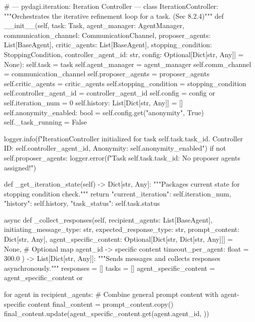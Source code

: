 \documentclass{amsbook}
\theoremstyle{definition}
\theoremstyle{remark}
\numberwithin{equation}{chapter} %
\begin{document}
\begin{python}
# --- pydagi.iteration: Iteration Controller ---
class IterationController:
    """Orchestrates the iterative refinement loop for a task. (Sec 8.2.4)"""
    def __init__(self,
                 task: Task,
                 agent_manager: AgentManager,
                 communication_channel: CommunicationChannel,
                 proposer_agents: List[BaseAgent],
                 critic_agents: List[BaseAgent],
                 stopping_condition: StoppingCondition,
                 controller_agent_id: str,
                 config: Optional[Dict[str, Any]] = None):
        self.task = task
        self.agent_manager = agent_manager
        self.comm_channel = communication_channel
        self.proposer_agents = proposer_agents
        self.critic_agents = critic_agents
        self.stopping_condition = stopping_condition
        self.controller_agent_id = controller_agent_id
        self.config = config or {}
        self.iteration_num = 0
        self.history: List[Dict[str, Any]] = []
        self.anonymity_enabled: bool = self.config.get("anonymity", True)
        self._task_running = False

        logger.info(f"IterationController initialized for task {self.task.task_id}. Controller ID: {self.controller_agent_id}, Anonymity: {self.anonymity_enabled}")
        if not self.proposer_agents: logger.error(f"Task {self.task.task_id}: No proposer agents assigned!")

    def _get_iteration_state(self) -> Dict[str, Any]:
        """Packages current state for stopping condition check."""
        return {"current_iteration": self.iteration_num, "history": self.history, "task_status": self.task.status}

    async def _collect_responses(self,
                                recipient_agents: List[BaseAgent],
                                initiating_message_type: str,
                                expected_response_type: str,
                                prompt_content: Dict[str, Any],
                                agent_specific_content: Optional[Dict[str, Dict[str, Any]]] = None, # Optional map agent_id -> specific content
                                timeout_per_agent: float = 300.0
                                ) -> List[Dict[str, Any]]:
        """Sends messages and collects responses asynchronously."""
        responses = []
        tasks = []
        agent_specific_content = agent_specific_content or {}

        for agent in recipient_agents:
             # Combine general prompt content with agent-specific content
             final_content = prompt_content.copy()
             final_content.update(agent_specific_content.get(agent.agent_id, {}))


\end{python}
\end{document}
